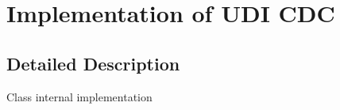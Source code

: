 \hypertarget{group__udi__cdc__group__internal}{\section{Implementation of U\-D\-I C\-D\-C}
\label{group__udi__cdc__group__internal}
}


\subsection{Detailed Description}
Class internal implementation 